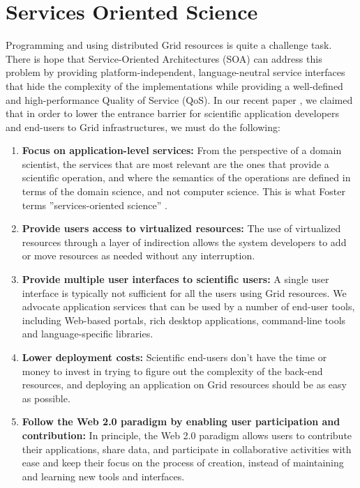 \documentclass[conference]{IEEEtran}
\begin{document}
\section {Services Oriented Science}

Programming and using distributed Grid resources is quite a challenge task.
There is hope that Service-Oriented Architectures (SOA) can address this
problem by providing platform-independent, language-neutral service
interfaces that hide the complexity of the implementations while providing
a well-defined and high-performance Quality of Service (QoS). In our recent
paper \cite{escience}, we claimed that in order to lower the entrance
barrier for scientific application developers and end-users to Grid
infrastructures, we must do the following:

\begin{enumerate}
\item{{\bf Focus on application-level services:} From the perspective of a
    domain scientist, the services that are most relevant are the ones that
    provide a scientific operation, and where the semantics of the
    operations are defined in terms of the domain science, and not computer
    science. This is what Foster terms ''services-oriented science''
    \cite{sos}.}

\item{{\bf Provide users access to virtualized resources:} The use of
    virtualized resources through a layer of indirection allows the system
    developers to add or move resources as needed without any interruption.}

\item{{\bf Provide multiple user interfaces to scientific users:} A single
    user interface is typically not sufficient for all the users using Grid
    resources. We advocate application services that can be used by a
    number of end-user tools, including Web-based portals, rich desktop
    applications, command-line tools and language-specific libraries.}

\item{{\bf Lower deployment costs:} Scientific end-users don’t have the
    time or money to invest in trying to figure out the complexity of the
    back-end resources, and deploying an application on Grid resources
    should be as easy as possible.}

\item{{\bf Follow the Web 2.0 paradigm by enabling user participation and
      contribution:} In principle, the Web 2.0 paradigm allows users to
    contribute their applications, share data, and participate in
    collaborative activities with ease and keep their focus on the process
    of creation, instead of maintaining and learning new tools and
    interfaces.}
\end{enumerate}
\end{document}
